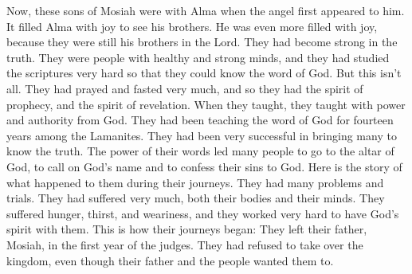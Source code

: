Now, these sons of Mosiah were with Alma when the angel first appeared to him. It filled Alma with joy to see his brothers. He was even more filled with joy, because they were still his brothers in the Lord. They had become strong in the truth. They were people with healthy and strong minds, and they had studied the scriptures very hard so that they could know the word of God.
\bverse \iffalse But this is not all; they had given themselves to much prayer, and fasting; therefore they had the spirit of prophecy, and the spirit of revelation, and when they taught, they taught with power and authority of God. \fi
But this isn't all. They had prayed and fasted very much, and so they had the spirit of prophecy, and the spirit of revelation. When they taught, they taught with power and authority from God.
\bverse \iffalse And they had been teaching the word of God for the space of fourteen years among the Lamanites, having had much success in bringing many to the knowledge of the truth; yea, by the power of their words many were brought before the altar of God, to call on his name and confess their sins before him. \fi
They had been teaching the word of God for fourteen years among the Lamanites. They had been very successful in bringing many to know the truth. The power of their words led many people to go to the altar of God, to call on God's name and to confess their sins to God.
\bverse \iffalse Now these are the circumstances which attended them in their journeyings, for they had many afflictions; they did suffer much, both in body and in mind, such as hunger, thirst and fatigue, and also much labor in the spirit. \fi
Here is the story of what happened to them during their journeys. They had many problems and trials. They had suffered very much, both their bodies and their minds. They suffered hunger, thirst, and weariness, and they worked very hard to have God's spirit with them.
\bverse \iffalse Now these were their journeyings: Having taken leave of their father, Mosiah, in the first year of the judges; having refused the kingdom which their father was desirous to confer upon them, and also this was the minds of the people; \fi
This is how their journeys began: They left their father, Mosiah, in the first year of the judges. They had refused to take over the kingdom, even though their father and the people wanted them to.
\bverse \iffalse Nevertheless they departed out of the land of Zarahemla, and took their swords, and their spears, and their bows, and their arrows, and their slings; and this they did that they might provide food for themselves while in the wilderness. \fi
